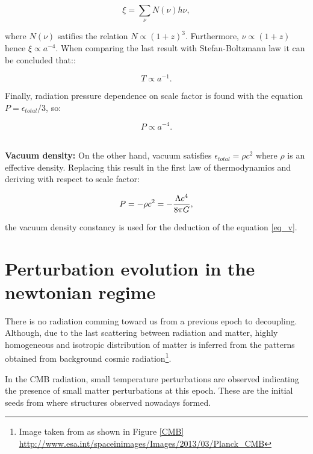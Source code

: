 \[\xi=\sum_{\nu}N(\nu)h\nu,\]

where $N(\nu)$ satifies the relation $N \propto (1+z)^3$. Furthermore, $\nu \propto (1+z)$ 
hence $\xi \propto a^{-4} $. When comparing the last result with Stefan-Boltzmann law 
it can be concluded that:: 

\[T\propto a^{-1}.\]
 
Finally, radiation pressure dependence on scale factor is found with the equation 
$ P=\epsilon_{total}/3$, so:

\begin{equation}
P \propto a^{-4}.
\end{equation}
\

\textbf{Vacuum density:} On the other hand, vacuum satisfies $\epsilon_{total}=\rho c^2$ 
where $\rho$ is an effective density. Replacing this result in the first law of thermodynamics
and deriving with respect to scale factor:

\begin{equation}
 P=-\rho c^2 = -\frac{ \Lambda c^4}{8\pi G},
\label{eq_v}
\end{equation}

the vacuum density constancy is used for the deduction of the equation \ref{eq_v}.

\section{ Perturbation evolution in the newtonian regime }

There is no radiation comming toward us from a previous 
epoch to decoupling. Although, due to the last scattering between radiation
and matter, highly homogeneous and isotropic distribution of matter is
inferred from the patterns obtained from background cosmic radiation\footnote{
Image taken from as shown in Figure \ref{CMB} \url{http://www.esa.int/spaceinimages/Images/2013/03/Planck_CMB}}.

In the CMB radiation, small temperature perturbations are observed indicating 
the presence of small matter perturbations at this epoch. These are the initial 
seeds from where structures observed nowadays formed. 


